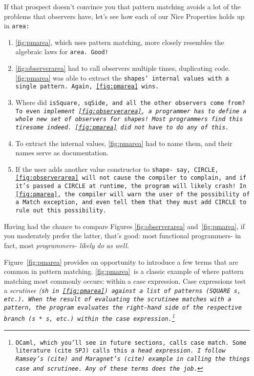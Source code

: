\documentclass[manuscript,screen,review, 12pt, nonacm]{acmart}
\begin{document}
\begin{outline}[enumerate]
    If that prospect doesn't convince you that pattern matching avoids a lot of
    the problems that observers have, let's see how each of our Nice Properties
    holds up in \tt{area}: 
    
    \begin{enumerate}
        \item \ref{fig:pmarea}, which uses pattern matching, more closely
        resembles the algebraic laws for \tt{area}. Good! 
        \item \ref{fig:observerarea} had to call observers multiple times,
        duplicating code. \ref{fig:pmarea} was able to extract the \tt{shape}s'
        internal values with a single pattern. Again, \ref{fig:pmarea}
        wins.
        \item Where did \tt{isSquare}, \tt{sqSide}, and all the other observers
        come from? To even \it{implement} \ref{fig:observerarea}, a programmer
        has to define a whole new set of observers for \tt{shape}s! Most
        programmers find this tiresome indeed. \ref{fig:pmarea} did not have to
        do any of this. 
        \item To extract the internal values, \ref{fig:pmarea} had to name them,
        and their names serve as documentation. 
        \item If the user adds another value constructor to \tt{shape}- say,
        \tt{CIRCLE}, \ref{fig:observerarea} will not cause the compiler to
        complain, and if it's passed a \tt{CIRCLE} at runtime, the program will
        likely crash! In \ref{fig:pmarea}, the compiler will warn the user of
        the possibility of a \tt{Match} exception, and even tell them that they
        must add \tt{CIRCLE} to rule out this possibility. 
    \end{enumerate}

    Having had the chance to compare Figures \ref{fig:observerarea}
    and~\ref{fig:pmarea}, if you moderately prefer the latter, that's good: most
    functional programmers- in fact, most \it{programmers}- likely do as well. 

    Figure~\ref{fig:pmarea} provides an opportunity to introduce a few terms
    that are common in pattern matching. \ref{fig:pmarea}~is a classic example
    of where pattern matching most commonly occurs: within a case expression.
    Case expressions test a \it{scrutinee} (\tt{sh} in~\ref{fig:pmarea}) against
    a list of patterns (\tt{SQUARE s}, etc.). When the result of evaluating the
    scrutinee matches with a pattern, the program evaluates the right-hand side
    of the respective branch (\tt{s * s}, etc.) within the case
    expression.\footnote{OCaml, which you'll see in future sections, calls case
    \tt{match}. Some literature (cite SPJ) calls this a \it{head expression}. I
    follow Ramsey's (cite) and Maragnet's (cite) example in calling the things
    \it{case} and \it{scrutinee}. Any of these terms does the job.} 


\end{outline}
\end{document}

